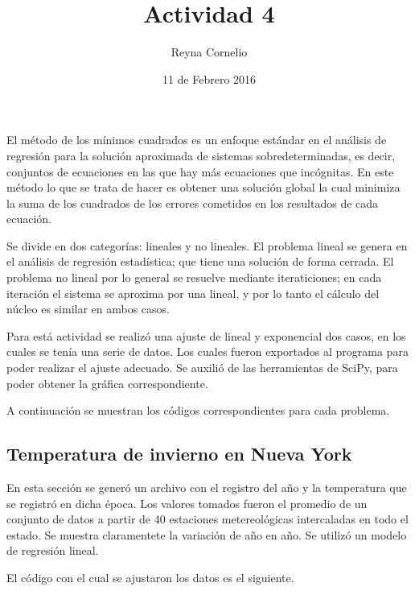 \documentclass[12pt]{article}
\begin{document}
\title{Actividad 4}
\author{Reyna Cornelio}
\date{11 de Febrero 2016}
\maketitle

El método de los mínimos cuadrados es un enfoque estándar en el análisis de regresión para la solución aproximada de sistemas sobredeterminadas, es decir, conjuntos de ecuaciones en las que hay más ecuaciones que incógnitas.
En este método lo que se trata de hacer es obtener una solución global la cual minimiza la suma de los cuadrados de  los errores cometidos en los resultados de cada ecuación.

Se divide en dos categorías: lineales y no lineales. El problema lineal se genera en el análisis de regresión estadística; que tiene una solución de forma cerrada. El problema no lineal por lo general se resuelve mediante iteraticiones; en cada iteración el sistema se aproxima por una lineal, y por lo tanto el cálculo del núcleo es similar en ambos casos.


Para está actividad se realizó una ajuste de lineal y exponencial dos casos, en los cuales se tenía una serie de datos. Los cuales fueron exportados al programa para poder realizar el ajuste adecuado.
Se auxilió de las herramientas de SciPy, para poder obtener la gráfica correspondiente. 


A continuación se muestran los códigos correspondientes para cada problema.

\subsection*{Temperatura de invierno en Nueva York}

En esta sección se generó un archivo con el registro del año y la temperatura que se registró en dicha época.
Los valores tomados fueron el promedio de un conjunto de datos a partir de 40 estaciones metereológicas intercaladas en todo el estado. Se muestra claramentete la variación de año en año.
Se utilizó un modelo de regresión lineal.


El código con el cual se ajustaron los datos es el siguiente.
\end{document}
